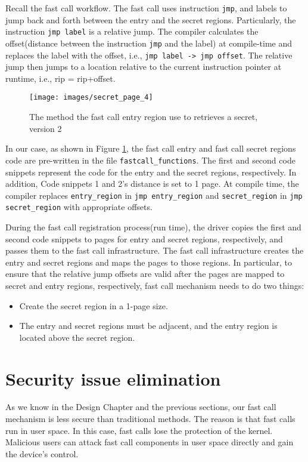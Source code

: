 Recall the fast call workflow. The fast call uses instruction \verb|jmp|, 
and labels to jump back and forth between the entry and the secret regions. 
Particularly, the instruction \verb|jmp label| is a relative jump. 
The compiler calculates the offset(distance between the instruction \verb|jmp|
and the label) at compile-time and replaces the label with the offset, i.e., 
\verb|jmp label -> jmp offset|. The relative jump then jumps to a location relative to the current 
instruction pointer at runtime, i.e., rip = rip+offset.
\begin{figure}[H]
  \centering
  \texttt{[image: images/secret\_page\_4]}
  \caption[Short description]{The method the fast call entry region use to retrieves a 
  secret, version 2}
   \label{fig:secret_page_4}
\end{figure}
In our case, as shown in Figure \ref{fig:secret_page_4},  the fast call entry and fast call 
secret regions code are pre-written in the file \verb|fastcall_functions|. 
The first and second code snippets represent the code for the entry and 
the secret regions, respectively. In addition,  Code snippets 1 and 2's 
distance is set to 1 page.  At compile time, the compiler replaces
\verb|entry_region| in \verb|jmp entry_region| and \verb|secret_region| in \verb|jmp secret_region|  
with appropriate offsets.  

During the fast call registration process(run time), 
the driver copies the first and second code snippets to pages for entry and secret 
regions, respectively, and passes them to the fast call infrastructure. 
The fast call infrastructure creates the entry and secret regions and maps the 
pages to those regions.  In particular, to ensure that the relative jump 
offsets are valid after the pages are mapped to secret and entry regions, 
respectively, fast call mechanism needs to do two things:


\begin{itemize}
  \item Create the secret region in a 1-page size.
  \item The entry and secret regions must be adjacent, and the entry region is located above the secret region.
\end{itemize}


\section{Security issue elimination}

As we know in the Design Chapter and the previous sections, our fast call 
mechanism is less secure than traditional methods. The reason is that fast 
calls run in user space. In this case, fast calls lose the protection of the kernel. Malicious users can attack fast call components in user space directly and gain the device's control.


